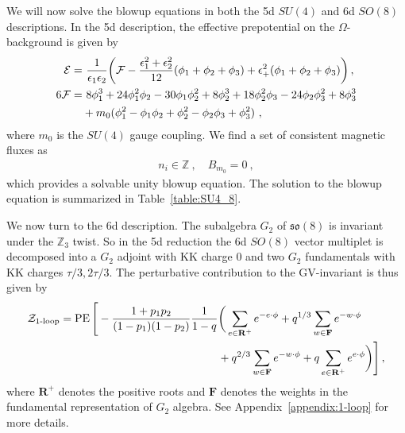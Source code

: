 We will now solve the blowup equations in both the 5d $SU(4)$ and 6d $SO(8)$ descriptions. In the 5d description, the effective prepotential on the $\Omega$-background is given by
\begin{align}\label{eq:su4_8_prepotential}
\mathcal{E} = & ~\frac{1}{\epsilon_1 \epsilon_2} \qty( \mathcal{F} - \frac{\epsilon_1^2 + \epsilon_2^2}{12} \qty(\phi_1 +\phi_2 +\phi_3) + \epsilon_+^2 (\phi_1 + \phi_2+ \phi_3) )\,, \nonumber \\
6\mathcal{F}
=&~ 8\phi_1^3 + 24\phi_1^2 \phi_2 - 30\phi_1 \phi_2^2 + 8\phi_2^3 + 18\phi_2^2 \phi_3 - 24\phi_2 \phi_3^2 + 8\phi_3^3 \nonumber \\
& + m_0 (\phi_1^2 - \phi_1 \phi_2 + \phi_2^2 - \phi_2 \phi_3 + \phi_3^2)\ ,
\end{align}
where $ m_0 $ is the $SU(4)$ gauge coupling. We find a set of consistent magnetic fluxes as
\begin{align}
n_i \in \mathbb{Z} \ , \quad
B_{m_0} = 0 \ ,
\end{align}
which provides a solvable unity blowup equation. The solution to the blowup equation is summarized in Table~\ref{table:SU4_8}.

We now turn to the 6d description. The subalgebra $G_2$ of $\mathfrak{so}(8)$ is invariant under the $\mathbb{Z}_3$ twist. So in the 5d reduction the 6d $SO(8)$ vector multiplet is decomposed into a $ G_2 $ adjoint with KK charge 0 and two $ G_2 $ fundamentals with KK charges $\tau/3,2\tau/3 $. The perturbative contribution to the GV-invariant is thus given by
\begin{align}
\mathcal{Z}_{\text{1-loop}}
= \operatorname{PE} \Bigg[-\frac{1+p_1 p_2}{(1-p_1)(1-p_2)} \frac{1}{1-q} &\bigg(\sum_{e \in \mathbf{R}^+} e^{-e\cdot \phi} + q^{1/3} \sum_{w \in \mathbf{F}} e^{-w\cdot \phi} \nonumber \\
& + q^{2/3} \sum_{w \in \mathbf{F}} e^{-w\cdot \phi} +  q\sum_{e\in \mathbf{R}^+} e^{e\cdot\phi}\bigg) \Bigg]\,,
\end{align}
where $ \mathbf{R}^+ $ denotes the positive roots and $ \mathbf{F} $ denotes the weights in the fundamental representation of $ G_2 $ algebra. See Appendix~\ref{appendix:1-loop} for more details.

